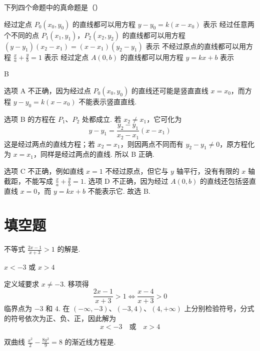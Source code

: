 \begin{problem}
下列四个命题中的真命题是（\quad）

\choices
    {经过定点 \(P_0(x_0,y_0)\) 的直线都可以用方程 \(y-y_0=k(x-x_0)\) 表示}
    {经过任意两个不同的点 \(P_1(x_1,y_1)\)，\(P_2(x_2,y_2)\) 的直线都可以用方程 \((y-y_1)(x_2-x_1)=(x-x_1)(y_2-y_1)\) 表示}
    {不经过原点的直线都可以用方程 \(\frac{x}{a}+\frac{y}{b}=1\) 表示}
    {经过定点 \(A(0,b)\) 的直线都可以用方程 \(y=kx+b\) 表示}
\end{problem}

\begin{answer}
B
\end{answer}

\begin{solution}
选项 A 不正确，因为经过点 \(P_0(x_0,y_0)\) 的直线还可能是竖直直线 \(x=x_0\)，而方程 \(y-y_0=k(x-x_0)\) 不能表示竖直直线.

选项 B 的方程在 \(P_1\)、\(P_2\) 处都成立. 若 \(x_2\ne x_1\)，它可化为
\[
y-y_1=\frac{y_2-y_1}{x_2-x_1}(x-x_1)
\]
这是经过两点的直线方程；若 \(x_2=x_1\)，则因两点不同而有 \(y_2-y_1\ne0\)，原方程化为 \(x=x_1\)，同样是经过两点的直线. 所以 B 正确.

选项 C 不正确，例如直线 \(x=1\) 不经过原点，但它与 \(y\) 轴平行，没有有限的 \(x\) 轴截距，不能写成 \(\frac{x}{a}+\frac{y}{b}=1\). 选项 D 不正确，因为经过 \(A(0,b)\) 的直线还包括竖直直线 \(x=0\)，而 \(y=kx+b\) 不能表示它. 故选 B.
\end{solution}

\section{填空题}

\begin{problem}
不等式 \(\frac{2x-1}{x+3}>1\) 的解是\fillinblank{}.
\end{problem}

\begin{answer}
\(x<-3\) 或 \(x>4\)
\end{answer}

\begin{solution}
定义域要求 \(x\ne-3\). 移项得
\[
\frac{2x-1}{x+3}>1
\iff \frac{x-4}{x+3}>0
\]
临界点为 \(-3\) 和 \(4\). 在 \((-\infty,-3)\)、\((-3,4)\)、\((4,+\infty)\) 上分别检验符号，分式的符号依次为正、负、正，因此解为
\[
x<-3\quad\text{或}\quad x>4
\]
\end{solution}

\begin{problem}
双曲线 \(\frac{x^2}{2}-\frac{8y^2}{9}=8\) 的渐近线方程是\fillinblank{}.
\end{problem}


